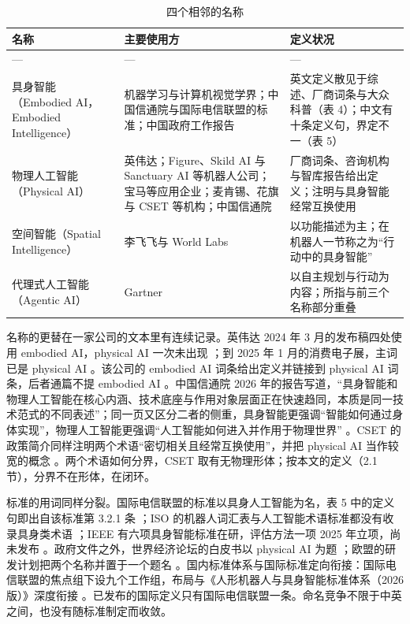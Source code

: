 \documentclass[10pt,fontset=fandol]{ctexart}
\begin{document}
\begin{table}[htbp]
\centering
\caption{四个相邻的名称}
\small
\begin{tabularx}{\textwidth}{>{\raggedright\arraybackslash}p{3.0cm}YY}
\toprule
名称 & 主要使用方 & 定义状况 \\
\midrule
--- & --- & --- \\
具身智能（Embodied AI，Embodied Intelligence） & 机器学习与计算机视觉学界；中国信通院与国际电信联盟的标准；中国政府工作报告 & 英文定义散见于综述、厂商词条与大众科普（表 4）；中文有十条定义句，界定不一（表 5） \\
物理人工智能（Physical AI） & 英伟达；Figure、Skild AI 与 Sanctuary AI 等机器人公司；宝马等应用企业；麦肯锡、花旗与 CSET 等机构；中国信通院 \cite{nvglossary,figure_f03,bmw2026,mckinsey2026,citi2025,caict2026} & 厂商词条、咨询机构与智库报告给出定义；注明与具身智能经常互换使用 \cite{cset2026} \\
空间智能（Spatial Intelligence） & 李飞飞与 World Labs & 以功能描述为主；在机器人一节称之为“行动中的具身智能” \cite{feili2025} \\
代理式人工智能（Agentic AI） & Gartner \cite{gartner2024} & 以自主规划与行动为内容；所指与前三个名称部分重叠 \\
\bottomrule
\end{tabularx}
\end{table}
名称的更替在一家公司的文本里有连续记录。英伟达 2024 年 3 月的发布稿四处使用 embodied AI，physical AI 一次未出现 \cite{nvidia2024}；到 2025 年 1 月的消费电子展，主词已是 physical AI \cite{ces2025}。该公司的 embodied AI 词条给出定义并链接到 physical AI 词条，后者通篇不提 embodied AI \cite{nvglossary}。中国信通院 2026 年的报告写道，“具身智能和物理人工智能在核心内涵、技术底座与作用对象层面正在快速趋同，本质是同一技术范式的不同表述”；同一页又区分二者的侧重，具身智能更强调“智能如何通过身体实现”，物理人工智能更强调“人工智能如何进入并作用于物理世界” \cite{caict2026}。CSET 的政策简介同样注明两个术语“密切相关且经常互换使用”，并把 physical AI 当作较宽的概念 \cite{cset2026}。两个术语如何分界，CSET 取有无物理形体；按本文的定义（2.1 节），分界不在形体，在闭环。

标准的用词同样分裂。国际电信联盟的标准以具身人工智能为名，表 5 中的定义句即出自该标准第 3.2.1 条 \cite{itu2025}；ISO 的机器人词汇表与人工智能术语标准都没有收录具身类术语 \cite{iso2021,isoiec2022}；IEEE 有六项具身智能标准在研，评估方法一项 2025 年立项，尚未发布 \cite{ieee2025}。政府文件之外，世界经济论坛的白皮书以 physical AI 为题 \cite{wef2025}；欧盟的研发计划把两个名称并置于一个题名 \cite{eucordis2025}。国内标准体系与国际标准定向衔接：国际电信联盟的焦点组下设九个工作组，布局与《人形机器人与具身智能标准体系（2026 版）》深度衔接 \cite{caict2026,std2026}。已发布的国际定义只有国际电信联盟一条。命名竞争不限于中英之间，也没有随标准制定而收敛。
\end{document}

